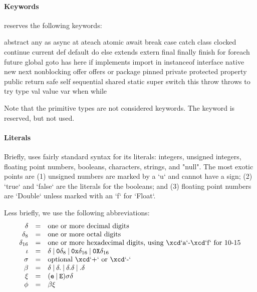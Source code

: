 \paragraph{Keywords}
\Xten{} reserves the following keywords:
\begin{xten}
abstract        any             as              async
at              ateach          atomic          await
break           case            catch           class
clocked         continue        current
def             default         do              else
extends         extern          final           finally
finish          for             foreach         future
global
goto            has             here            if             
implements      import          in
instanceof      interface
native          new             next            nonblocking     
offer           offers
or              package         pinned          private        
protected       property        public          return
safe            self            sequential      shared
static
super           switch          this            throw
throws          to              try             type
val             value           var             when
while
\end{xten}
Note that the primitive types are not considered keywords.
The keyword  is reserved, but not used.

\paragraph{Literals}\label{Literals}

Briefly, \XtenCurrVer{} uses fairly standard syntax for its literals:
integers, unsigned integers, floating point numbers, booleans, 
characters, strings, and \xcd"null".  The most exotic points are (1) unsigned
numbers are marked by a \xcd`u` and cannot have a sign; (2) \xcd`true` and
\xcd`false` are the literals for the booleans; and (3) floating point numbers
are \xcd`Double` unless marked with an \xcd`f` for \xcd`Float`. 

Less briefly, we use the following abbreviations: 
\begin{displaymath}
\begin{array}{rcll}
\delta &=& \mbox{one or more decimal digits}\\
\delta_8 &=& \mbox{one or more octal digits}\\
\delta_{16} &=& \mbox{one or more hexadecimal digits, using \xcd`a`-\xcd`f`
for 10-15}\\
\iota &=& \delta 
        \mathbin{|} {\tt 0} \delta_8 
        \mathbin{|} {\tt 0x} \delta_{16}
        \mathbin{|} {\tt 0X} \delta_{16}
\\
\sigma &=& \mbox{optional \xcd`+` or \xcd`-`}\\
\beta &=& \delta 
          \mathbin{|} \delta {\tt .}
          \mathbin{|} \delta {\tt .} \delta
          \mathbin{|}  {\tt .} \delta \\
\xi &=& ({\tt e } \mathbin{|} {\tt E})
         \sigma
         \delta \\
\phi &=& \beta \xi
\end{array}
\end{displaymath}

